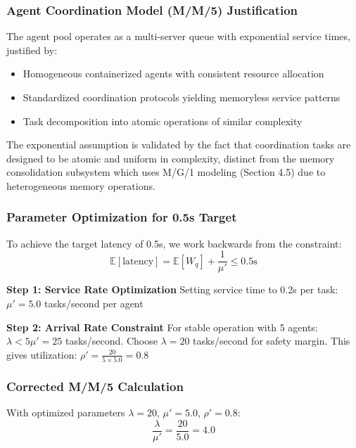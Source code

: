 \documentclass{article}
\begin{document}
\subsubsection{Agent Coordination Model (M/M/5) Justification}

The agent pool operates as a multi-server queue with exponential service times, justified by:
\begin{itemize}
\item Homogeneous containerized agents with consistent resource allocation
\item Standardized coordination protocols yielding memoryless service patterns  
\item Task decomposition into atomic operations of similar complexity
\end{itemize}

The exponential assumption is validated by the fact that coordination tasks are designed to be atomic and uniform in complexity, distinct from the memory consolidation subsystem which uses M/G/1 modeling (Section 4.5) due to heterogeneous memory operations.

\subsubsection{Parameter Optimization for 0.5s Target}

To achieve the target latency of 0.5s, we work backwards from the constraint:
\begin{equation}
\mathbb{E}[\text{latency}] = \mathbb{E}[W_q] + \frac{1}{\mu'} \leq 0.5\text{s}
\end{equation}

\textbf{Step 1: Service Rate Optimization}
Setting service time to 0.2s per task: $\mu' = 5.0$ tasks/second per agent

\textbf{Step 2: Arrival Rate Constraint}
For stable operation with 5 agents: $\lambda < 5\mu' = 25$ tasks/second.
Choose $\lambda = 20$ tasks/second for safety margin.
This gives utilization: $\rho' = \frac{20}{5 \times 5.0} = 0.8$

\subsubsection{Corrected M/M/5 Calculation}

With optimized parameters $\lambda = 20$, $\mu' = 5.0$, $\rho' = 0.8$:
\begin{equation}
\frac{\lambda}{\mu'} = \frac{20}{5.0} = 4.0
\end{equation}
\end{document}
